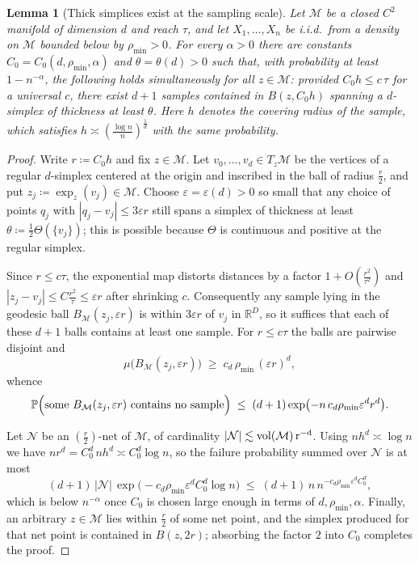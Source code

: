 \documentclass[11pt]{amsart}%
\newcommand*{\vol}{\rm{vol}}
\theoremstyle{plain}
\newtheorem{lemma}[definition]{Lemma}
\newcommand{\PP}{{\mathbb P}}
\newcommand{\R}{{\mathbb R}}
\newcommand{\1}{\mathbf{1}}
\newcommand{\M}{\mathcal{M}}
\newcommand{\veps}{\varepsilon}
\begin{document}
\begin{lemma}[Thick simplices exist at the sampling scale]
    \label{Lem:ThickExists}
    Let $\M$ be a closed $C^2$ manifold of dimension $d$ and reach $\tau$, and let
    $X_1,\dots,X_n$ be i.i.d.\ from a density on $\M$ bounded below by $\rho_{\min}>0$. For every
    $\alpha>0$ there are constants $C_0=C_0(d,\rho_{\min},\alpha)$ and $\theta=\theta(d)>0$ such
    that, with probability at least $1-n^{-\alpha}$, the following holds simultaneously for all
    $z\in \M$: provided $C_0h\le c\,\tau$ for a universal $c$, there exist $d+1$ samples contained in
    $B(z,C_0h)$ spanning a $d$-simplex of thickness at least $\theta$. Here $h$ denotes the covering
    radius of the sample, which satisfies $h\asymp\left(\frac{\log n}{n}\right)^{\frac{1}{d}}$ with the same probability.
\end{lemma}

\begin{proof}
    Write $r\coloneqq C_0 h$ and fix $z\in \M$. Let $v_0,\dots,v_d\in T_z\M$ be the vertices of a
    regular $d$-simplex centered at the origin and inscribed in the ball of radius $\frac{r}{2}$, and put
    $z_j\coloneqq\exp_z(v_j)\in \M$. Choose $\veps=\veps(d)>0$ so small that any choice of points
    $q_j$ with $|q_j-v_j|\le 3\veps r$ still spans a simplex of thickness at least
    $\theta\coloneqq\tfrac12\Theta(\{v_j\})$; this is possible because $\Theta$ is continuous and
    positive at the regular simplex.

    Since $r\le c\tau$, the exponential map distorts distances by a factor $1+O\left(\frac{r^2}{\tau^2}\right)$ and
    $|z_j-v_j|\le C \frac{r^2}{\tau}\le\veps r$ after shrinking $c$. Consequently any sample lying in the
    geodesic ball $B_\M(z_j,\veps r)$ is within $3\veps r$ of $v_j$ in $\R^D$, so it suffices that
    each of these $d+1$ balls contains at least one sample. For $r\le c\tau$ the balls are pairwise
    disjoint and
    \[
        \mu\bigl(B_\M(z_j,\veps r)\bigr)\;\ge\;c_d\,\rho_{\min}\,(\veps r)^d ,
    \]
    whence
    \[
        \PP\Bigl(\text{some } B_\M(z_j,\veps r)\text{ contains no sample}\Bigr)
        \;\le\;(d+1)\exp\bigl(-n\,c_d\rho_{\min}\veps^d r^d\bigr).
    \]

    Let $\mathcal N$ be an $\left(\frac{r}{2}\right)$-net of $\M$, of cardinality $|\mathcal N|\lesssim \vol(\M)\,r^{-d}$.
    Using $n h^d\asymp\log n$ we have $n r^d = C_0^d\,n h^d\asymp C_0^d\log n$, so the failure
    probability summed over $\mathcal N$ is at most
    \[
        (d+1)\,|\mathcal N|\,\exp\bigl(-c_d\rho_{\min}\veps^d C_0^d\log n\bigr)
        \;\le\;(d+1)\,n\,n^{-c_d\rho_{\min}\veps^d C_0^d},
    \]
    which is below $n^{-\alpha}$ once $C_0$ is chosen large enough in terms of
    $d,\rho_{\min},\alpha$. Finally, an arbitrary $z\in \M$ lies within $\frac{r}{2}$ of some net point, and
    the simplex produced for that net point is contained in $B(z,2r)$; absorbing the factor $2$ into
    $C_0$ completes the proof.
\end{proof}
\end{document}
